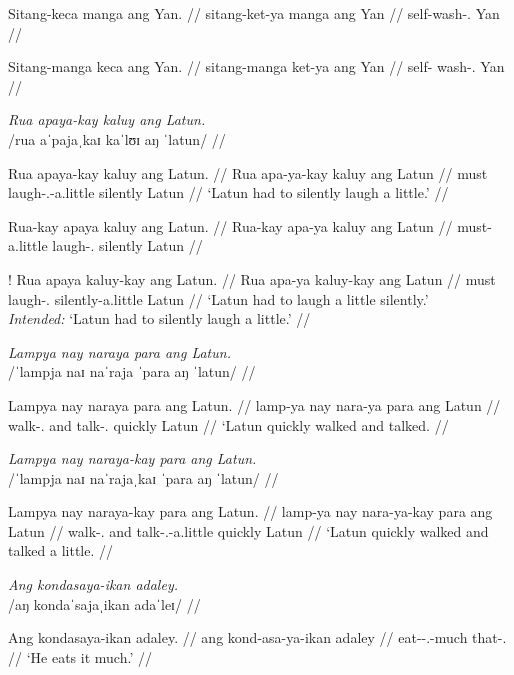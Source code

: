 \documentclass[12pt,a4paper]{scrartcl}
\newcommand{\PargI}{{\Parg}.{\Inan}}
\newcommand{\TsgM}{{\Tsg}.{\M}}
\begin{document}
\a\ljudge*\begingl
\gla Sitang-keca manga ang Yan. //
\glb sitang-ket-ya manga ang Yan //
\glc self-wash-\TsgM{} \Prog{} \Aarg{} Yan //
\endgl

\a\ljudge*\begingl
\gla Sitang-manga keca ang Yan. //
\glb sitang-manga ket-ya ang Yan //
\glc self-\Prog{} wash-\TsgM{} \Aarg{} Yan //
\endgl

\xe

\pex
\a\begingl
	\glpreamble \textit{Rua apaya-kay kaluy ang Latun.} \\
		/rua aˈpajaˌkaɪ kaˈlʊɪ aŋ ˈlatun/ //

	\gla Rua apaya-kay kaluy ang Latun. //
	\glb Rua apa-ya-kay kaluy ang Latun //
	\glc must laugh-\TsgM{}-a.little silently \Aarg{} Latun //
	\glft `Latun had to silently laugh a little.' //
\endgl

\a\ljudge*\begingl
	\gla Rua-kay apaya kaluy ang Latun. //
	\glb Rua-kay apa-ya kaluy ang Latun //
	\glc must-a.little laugh-\TsgM{} silently \Aarg{} Latun //
\endgl

\a\ljudge!\begingl
	\gla Rua apaya kaluy-kay ang Latun. //
	\glb Rua apa-ya kaluy-kay ang Latun //
	\glc must laugh-\TsgM{} silently-a.little \Aarg{} Latun //
	\glft `Latun had to laugh a little silently.' \\
		\textit{Intended:} `Latun had to silently laugh a little.' //
\endgl

\xe

\ex\begingl
\glpreamble \textit{Lampya nay naraya para ang Latun.} \\
	/ˈlampja naɪ naˈraja ˈpara aŋ ˈlatun/ //

\gla Lampya nay naraya para ang Latun. //
\glb lamp-ya nay nara-ya para ang Latun //
\glc walk-\TsgM{} and talk-\TsgM{} quickly \Aarg{} Latun //
\glft `Latun quickly walked and talked. //
\endgl\xe

\ex\begingl
\glpreamble \textit{Lampya nay naraya-kay para ang Latun.} \\
	/ˈlampja naɪ naˈrajaˌkaɪ ˈpara aŋ ˈlatun/ //

\gla Lampya nay naraya-kay para ang Latun. //
\glb lamp-ya nay nara-ya-kay para ang Latun //
\glc walk-\TsgM{} and talk-\TsgM{}-a.little quickly \Aarg{} Latun //
\glft `Latun quickly walked and talked a little. //
\endgl\xe

\ex\begingl
\glpreamble \textit{Ang kondasaya-ikan adaley.} \\
	/aŋ kondaˈsajaˌikan adaˈleɪ/ //

\gla Ang kondasaya-ikan adaley. //
\glb ang kond-asa-ya-ikan adaley //
\glc \AgtT{} eat-\Hab{}-\TsgM{}-much that-\PargI{} //
\glft `He eats it much.' //
\endgl\xe
\end{document}
